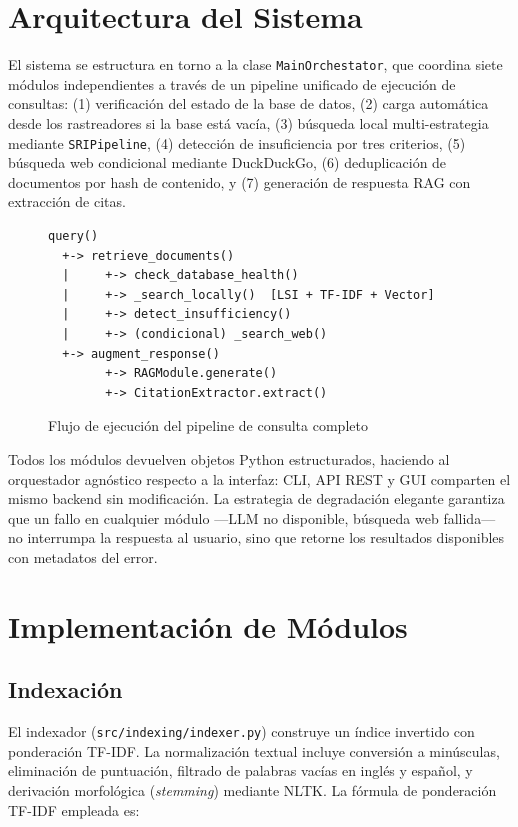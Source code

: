 \documentclass[runningheads,a4paper]{llncs}
\begin{document}
\section{Arquitectura del Sistema}

El sistema se estructura en torno a la clase \texttt{MainOrchestator}, que coordina siete módulos independientes a través de un pipeline unificado de ejecución de consultas: (1) verificación del estado de la base de datos, (2) carga automática desde los rastreadores si la base está vacía, (3) búsqueda local multi-estrategia mediante \texttt{SRIPipeline}, (4) detección de insuficiencia por tres criterios, (5) búsqueda web condicional mediante DuckDuckGo, (6) deduplicación de documentos por hash de contenido, y (7) generación de respuesta RAG con extracción de citas.

\begin{figure}[h]
\centering
\begin{verbatim}
query()
  +-> retrieve_documents()
  |     +-> check_database_health()
  |     +-> _search_locally()  [LSI + TF-IDF + Vector]
  |     +-> detect_insufficiency()
  |     +-> (condicional) _search_web()
  +-> augment_response()
        +-> RAGModule.generate()
        +-> CitationExtractor.extract()
\end{verbatim}
\caption{Flujo de ejecución del pipeline de consulta completo}
\end{figure}

Todos los módulos devuelven objetos Python estructurados, haciendo al orquestador agnóstico respecto a la interfaz: CLI, API REST y GUI comparten el mismo backend sin modificación. La estrategia de degradación elegante garantiza que un fallo en cualquier módulo —LLM no disponible, búsqueda web fallida— no interrumpa la respuesta al usuario, sino que retorne los resultados disponibles con metadatos del error.

\section{Implementación de Módulos}

\subsection{Indexación}

El indexador (\texttt{src/indexing/indexer.py}) construye un índice invertido con ponderación TF-IDF. La normalización textual incluye conversión a minúsculas, eliminación de puntuación, filtrado de palabras vacías en inglés y español, y derivación morfológica (\emph{stemming}) mediante NLTK. La fórmula de ponderación TF-IDF empleada es:
\end{document}
